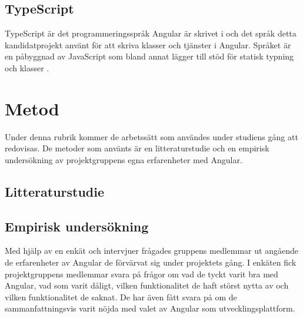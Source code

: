 \subsection{TypeScript}

TypeScript är det programmeringsspråk Angular är skrivet i och det språk detta kandidatprojekt använt för att skriva klasser och tjänster i Angular. Språket är en påbyggnad av JavaScript som bland annat lägger till stöd för statisk typning och klasser \cite{typescript}.

\section{Metod}

Under denna rubrik kommer de arbetssätt som användes under studiens gång att redovisas. De metoder som använts är en litteraturstudie och en empirisk undersökning av projektgruppens egna erfarenheter med Angular. 

\subsection{Litteraturstudie}

\subsection{Empirisk undersökning} 

Med hjälp av en enkät och intervjuer frågades gruppens medlemmar ut angående de erfarenheter av Angular de förvärvat sig under projektets gång. I enkäten fick projektgruppens medlemmar svara på frågor om vad de tyckt varit bra med Angular, vad som varit dåligt, vilken funktionalitet de haft störst nytta av och vilken funktionalitet de saknat. De har även fått svara på om de sammanfattningsvis varit nöjda med valet av Angular som utvecklingsplattform.  
